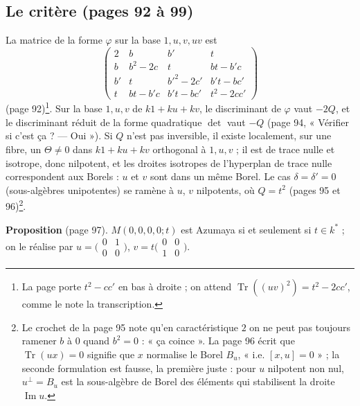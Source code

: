 \documentclass[11pt,a4paper]{article}
\begin{document}
\subsection*{Le critère (pages 92 à 99)}

La matrice de la forme $\varphi$ sur la base $1, u, v, uv$ est
\[
  \begin{pmatrix}
    2 & b & b' & t \\
    b & b^2 - 2c & t & bt - b'c \\
    b' & t & b'^2 - 2c' & b't - bc' \\
    t & bt - b'c & b't - bc' & t^2 - 2cc'
  \end{pmatrix}
\]
(page 92)\footnote{La page porte $t^2 - cc'$ en bas à droite ; on attend
$\operatorname{Tr}((uv)^2) = t^2 - 2cc'$, comme le note la transcription.}. Sur
la base $1, u, v$ de $k1 + ku + kv$, le discriminant de $\varphi$ vaut $-2Q$,
et le discriminant réduit de la forme quadratique $\det$ vaut $-Q$ (page 94,
« Vérifier si c'est ça ? — Oui »). Si $Q$ n'est pas inversible, il existe
localement, sur une fibre, un $\Theta \neq 0$ dans $k1 + ku + kv$ orthogonal à
$1, u, v$ ; il est de trace nulle et isotrope, donc nilpotent, et les droites
isotropes de l'hyperplan de trace nulle correspondent aux Borels : $u$ et $v$
sont dans un même Borel. Le cas $\delta = \delta' = 0$ (sous-algèbres
unipotentes) se ramène à $u$, $v$ nilpotents, où $Q = t^2$ (pages 95 et
96)\footnote{Le crochet de la page 95 note qu'en caractéristique $2$ on ne
peut pas toujours ramener $b$ à $0$ quand $b^2 = 0$ : « ça coince ». La page
96 écrit que $\operatorname{Tr}(ux) = 0$ signifie que $x$ normalise le Borel
$B_u$, « i.e. $[x, u] = 0$ » ; la seconde formulation est fausse, la première
juste : pour $u$ nilpotent non nul, $u^{\perp} = B_u$ est la sous-algèbre de
Borel des éléments qui stabilisent la droite $\operatorname{Im}u$.}.

\textbf{Proposition} (page 97). $M(0, 0, 0, 0; t)$ est Azumaya si et seulement
si $t \in k^{*}$ ; on le réalise par $u = \bigl(\begin{smallmatrix} 0 & 1 \\ 0
& 0\end{smallmatrix}\bigr)$, $v = t\bigl(\begin{smallmatrix} 0 & 0 \\ 1 &
0\end{smallmatrix}\bigr)$.
\end{document}
